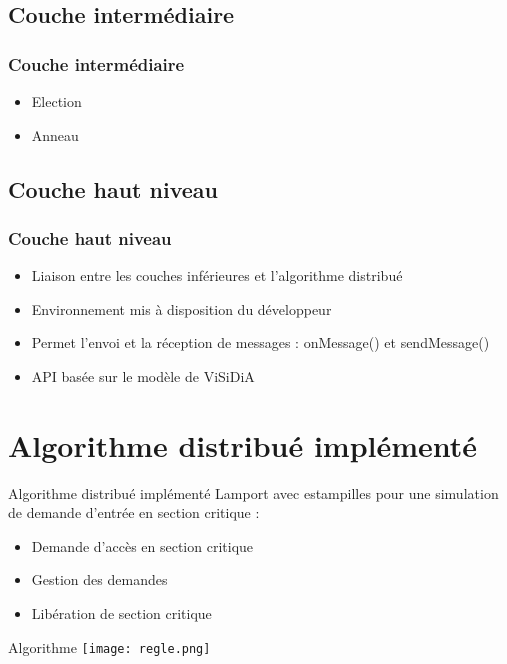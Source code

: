 \documentclass{beamer}
\begin{document}
      \subsection{Couche intermédiaire}
      \begin{frame}
	  \frametitle{Couche intermédiaire}
	  \begin{itemize}
	      \item Election
	      \item Anneau
	  \end{itemize}
      \end{frame}
      \subsection{Couche haut niveau}
      \begin{frame}
	  \frametitle{Couche haut niveau}
	  \begin{itemize}
	      \item Liaison entre les couches inférieures et l'algorithme distribué
	      \item Environnement mis à disposition du développeur
	      \item Permet l'envoi et la réception de messages : onMessage() et sendMessage()
	      \item API basée sur le modèle de ViSiDiA
	  \end{itemize}
      \end{frame}
    \section{Algorithme distribué implémenté}
    \begin{frame}{Algorithme distribué implémenté}
    Lamport avec estampilles pour une simulation de demande d’entrée en section critique :
        \begin{itemize}
            \item Demande d'accès en section critique
            \item Gestion des demandes
            \item Libération de section critique
        \end{itemize}
    \end{frame}
    \begin{frame}{Algorithme}
        \texttt{[image: regle.png]}
    \end{frame}
\end{document}
